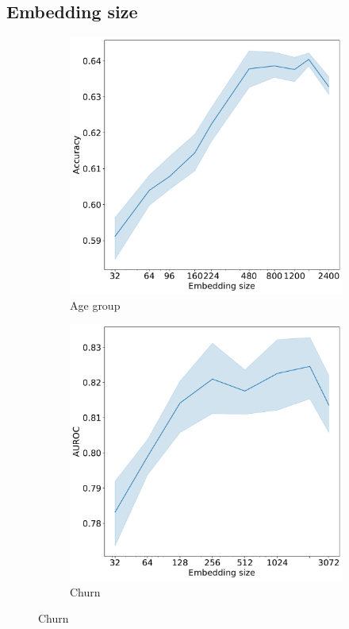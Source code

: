 \documentclass[sigconf]{acmart}
\begin{document}
\subsection{Embedding size}

\begin{figure}
  \centering
  \caption{Embedding dimensionality vs. quality}
  \begin{subfigure}{0.25\linewidth}
    \caption{Age group}
    \includegraphics[width=\linewidth]{figures/hidden_size_age_pred.pdf}
  \end{subfigure}%
  \begin{subfigure}{0.25\linewidth}
    \caption{Churn}
    \includegraphics[width=\linewidth]{figures/hidden_size_rosbank.pdf}

\end{subfigure}
\end{figure}
\end{document}
